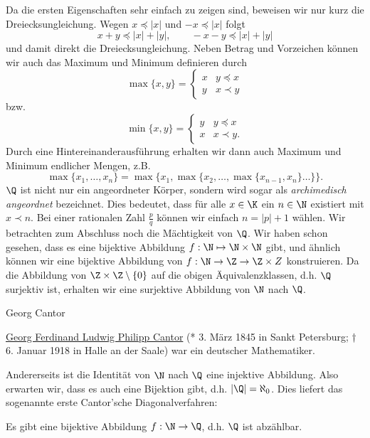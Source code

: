 \documentclass[letterpaper,10pt,english]{jupyterBook}
\begin{document}
Da die ersten Eigenschaften sehr einfach zu zeigen sind, beweisen wir nur kurz die Dreiecksungleichung. Wegen \(x \preceq |x|\) und \(-x \preceq |x|\) folgt
\begin{equation*}
x+y \preceq |x|+|y|, \qquad -x-y \preceq |x|+|y|
\end{equation*}
und damit direkt die Dreiecksungleichung.
Neben Betrag und Vorzeichen können wir auch das Maximum und Minimum definieren durch
\begin{equation*}
\max\{x,y\} = \left\{ \begin{array}{rl} x & y \preceq x \\ y & x \prec y \end{array} \right.
\end{equation*}
bzw.
\begin{equation*}
\min\{x,y\} = \left\{ \begin{array}{rl} y & y \preceq x \\ x & x \prec y. \end{array} \right.
\end{equation*}
Durch eine Hintereinanderausführung erhalten wir dann auch Maximum und Minimum endlicher Mengen, z.B.
\begin{equation*}
\max\{x_1,\ldots,x_n\} = \max\{x_1,\max\{x_2, \ldots, \max\{x_{n-1},x_n\} \ldots\}\}.
\end{equation*}
\(\Q\) ist nicht nur ein angeordneter Körper, sondern wird sogar als \emph{archimedisch angeordnet} bezeichnet. Dies bedeutet, dass für alle \(x \in \K\) ein \(n \in \N\) existiert mit \(x \prec n\). Bei einer rationalen Zahl \(\frac{p}q\) können wir einfach \(n = |p|+1\) wählen.
Wir betrachten zum Abschluss noch die Mächtigkeit von \(\Q\). Wir haben schon gesehen, dass es eine bijektive Abbildung \(f: \N \mapsto \N \times \N\) gibt, und ähnlich können wir eine bijektive Abbildung von \(f: \N \rightarrow \Z \rightarrow \Z \times Z\) konstruieren. Da die Abbildung von \(\Z \times \Z \setminus \{0\}\) auf die obigen Äquivalenzklassen, d.h. \(\Q\) surjektiv ist, erhalten wir eine surjektive Abbildung von \(\N\) nach \(\Q\).

\begin{emphBox}{Georg Cantor}{}

\href{https://de.wikipedia.org/wiki/Georg\_Cantor}{Georg Ferdinand Ludwig Philipp Cantor} (* 3. März 1845 in Sankt Petersburg; † 6. Januar 1918 in Halle an der Saale) war ein deutscher Mathematiker.
\end{emphBox}

Andererseits ist die Identität von \(\N\) nach \(\Q\) eine injektive Abbildung. Also erwarten wir, dass es auch eine Bijektion gibt, d.h. \(|\Q|=\aleph_0\). Dies liefert das sogenannte erste Cantor’sche Diagonalverfahren:
\label{grundlagen/zahlensysteme:theorem-11}
\begin{theorem}{}{}



Es gibt eine bijektive Abbildung \(f: \N \rightarrow \Q\), d.h. \(\Q\) ist abzählbar.
\end{theorem}
\end{document}
